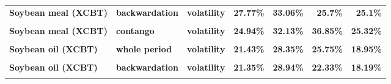 \documentclass[
  authoryear,
  preprint,
  3p]{elsarticle}
\begin{document}
\begin{longtable}[t]{>{}l>{}l>{}l>{}r>{}r>{}r>{}r}
\addlinespace
\textbf{Soybean meal (XCBT)} & \textbf{backwardation} & \textbf{volatility} & \textcolor[HTML]{4285f4}{\textbf{27.77\%}} & \textcolor[HTML]{4285f4}{\textbf{33.06\%}} & \textcolor[HTML]{4285f4}{\textbf{25.7\%}} & \textcolor[HTML]{4285f4}{\textbf{25.1\%}}\\
\textbf{\cellcolor{gray!10}{Soybean meal (XCBT)}} & \textbf{\cellcolor{gray!10}{contango}} & \textbf{\cellcolor{gray!10}{mean}} & \textcolor[HTML]{4285f4}{\textbf{\cellcolor{gray!10}{1.52\%}}} & \textcolor[HTML]{4285f4}{\textbf{\cellcolor{gray!10}{15.91\%}}} & \textcolor[HTML]{4285f4}{\textbf{\cellcolor{gray!10}{2.32\%}}} & \textcolor[HTML]{4285f4}{\textbf{\cellcolor{gray!10}{2.22\%}}}\\
\textbf{Soybean meal (XCBT)} & \textbf{contango} & \textbf{volatility} & \textcolor[HTML]{4285f4}{\textbf{24.94\%}} & \textcolor[HTML]{4285f4}{\textbf{32.13\%}} & \textcolor[HTML]{4285f4}{\textbf{36.85\%}} & \textcolor[HTML]{4285f4}{\textbf{25.32\%}}\\
\textbf{\cellcolor{gray!10}{Soybean oil (XCBT)}} & \textbf{\cellcolor{gray!10}{whole period}} & \textbf{\cellcolor{gray!10}{mean}} & \textcolor[HTML]{4285f4}{\textbf{\cellcolor{gray!10}{6.21\%}}} & \textcolor[HTML]{4285f4}{\textbf{\cellcolor{gray!10}{15.57\%}}} & \textcolor[HTML]{4285f4}{\textbf{\cellcolor{gray!10}{4.04\%}}} & \textcolor[HTML]{4285f4}{\textbf{\cellcolor{gray!10}{-7.39\%}}}\\
\textbf{Soybean oil (XCBT)} & \textbf{whole period} & \textbf{volatility} & \textcolor[HTML]{4285f4}{\textbf{21.43\%}} & \textcolor[HTML]{4285f4}{\textbf{28.35\%}} & \textcolor[HTML]{4285f4}{\textbf{25.75\%}} & \textcolor[HTML]{4285f4}{\textbf{18.95\%}}\\
\addlinespace
\textbf{\cellcolor{gray!10}{Soybean oil (XCBT)}} & \textbf{\cellcolor{gray!10}{backwardation}} & \textbf{\cellcolor{gray!10}{mean}} & \textcolor[HTML]{4285f4}{\textbf{\cellcolor{gray!10}{14.79\%}}} & \textcolor[HTML]{4285f4}{\textbf{\cellcolor{gray!10}{14.62\%}}} & \textcolor[HTML]{4285f4}{\textbf{\cellcolor{gray!10}{20.34\%}}} & \textcolor[HTML]{4285f4}{\textbf{\cellcolor{gray!10}{-9.44\%}}}\\
\textbf{Soybean oil (XCBT)} & \textbf{backwardation} & \textbf{volatility} & \textcolor[HTML]{4285f4}{\textbf{21.35\%}} & \textcolor[HTML]{4285f4}{\textbf{28.94\%}} & \textcolor[HTML]{4285f4}{\textbf{22.33\%}} & \textcolor[HTML]{4285f4}{\textbf{18.19\%}}\\
\textbf{\cellcolor{gray!10}{Soybean oil (XCBT)}} & \textbf{\cellcolor{gray!10}{contango}} & \textbf{\cellcolor{gray!10}{mean}} & \textcolor[HTML]{4285f4}{\textbf{\cellcolor{gray!10}{-2.68\%}}} & \textcolor[HTML]{4285f4}{\textbf{\cellcolor{gray!10}{16.62\%}}} & \textcolor[HTML]{4285f4}{\textbf{\cellcolor{gray!10}{-10.01\%}}} & \textcolor[HTML]{4285f4}{\textbf{\cellcolor{gray!10}{-4.12\%}}}\\

\end{longtable}
\end{document}
